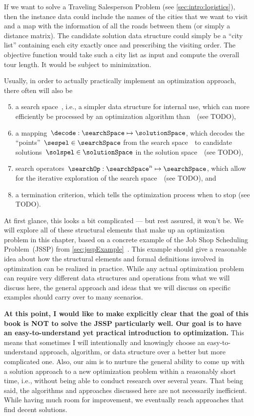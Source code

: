 %
If we want to solve a Traveling Salesperson Problem (see \autoref{sec:intro:logistics}), then the instance data could include the names of the cities that we want to visit and a map with the information of all the roads between them (or simply a distance matrix).
The candidate solution data structure could simply be a ``city list'' containing each city exactly once and prescribing the visiting order.
The objective function would take such a city list as input and compute the overall tour length.
It would be subject to minimization.

Usually, in order to actually practically implement an optimization approach, there often will also be%
%
\begin{enumerate}%
\setcounter{enumi}{4}%
%
\item a search space~\searchSpace, i.e., a simpler data structure for internal use, which can more efficiently be processed by an optimization algorithm than~\solutionSpace\ (see TODO),%
%
\item a mapping~$\decode:\searchSpace\mapsto\solutionSpace$, which decodes the ``points''~$\sespel\in\searchSpace$ from the search space~\searchSpace\ to candidate solutions~$\solspel\in\solutionSpace$ in the solution space~\solutionSpace\ (see TODO),%
%
\item search operators~$\searchOp:\searchSpace^n\mapsto\searchSpace$, which allow for the iterative exploration of the search space~\searchSpace\ (see TODO), and%
%
\item a termination criterion, which tells the optimization process when to stop (see TODO).%
%
\end{enumerate}%
%
At first glance, this looks a bit complicated --- but rest assured, it won't be.
We will explore all of these structural elements that make up an optimization problem in this chapter, based on a concrete example of the Job Shop Scheduling Problem~(JSSP) from \autoref{sec:jsspExample}~\cite{GLLRK1979OAAIDSASAS,LLRKS1993SASAAC,L1982RRITTOMS,T1993BFBSP,BDP1996TJSSPCANST}.
This example should give a reasonable idea about how the structural elements and formal definitions involved in optimization can be realized in practice.
While any actual optimization problem can require very different data structures and operations from what we will discuss here, the general approach and ideas that we will discuss on specific examples should carry over to many scenarios.

\textbf{At this point, I would like to make explicitly clear that the goal of this book is NOT to solve the JSSP particularly well. Our goal is to have an easy-to-understand yet practical introduction to optimization.}
This means that sometimes I will intentionally and knowingly choose an easy-to-understand approach, algorithm, or data structure over a better but more complicated one.
Also, our aim is to nurture the general ability to come up with a solution approach to a new optimization problem within a reasonably short time, i.e., without being able to conduct research over several years.
That being said, the algorithms and approaches discussed here are not necessarily inefficient.
While having much room for improvement, we eventually reach approaches that find decent solutions.
\endhsection%
%
